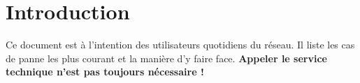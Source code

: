\section{Introduction}

Ce document est à l'intention des utilisateurs quotidiens du réseau. Il
liste les cas de panne les plus courant et la manière d'y faire face.
\textbf{Appeler le service technique n'est pas toujours nécessaire !}
